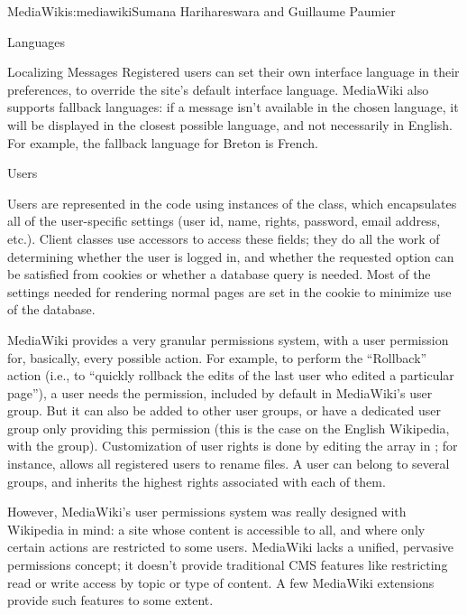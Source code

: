 \begin{aosachapter}{MediaWiki}{s:mediawiki}{Sumana Harihareswara and Guillaume Paumier}
\begin{aosasect1}{Languages}
\begin{aosasect2}{Localizing Messages}
Registered users can set their own interface language in their
preferences, to override the site's default interface
language. MediaWiki also supports fallback languages: if a message
isn't available in the chosen language, it will be displayed in the
closest possible language, and not necessarily in English. For
example, the fallback language for Breton is French.

\end{aosasect2}

\end{aosasect1}

\begin{aosasect1}{Users}

Users are represented in the code using instances of the 
class, which encapsulates all of the user-specific settings (user id,
name, rights, password, email address, etc.). Client classes use
accessors to access these fields; they do all the work of determining
whether the user is logged in, and whether the requested option can be
satisfied from cookies or whether a database query is needed. Most of
the settings needed for rendering normal pages are set in the cookie
to minimize use of the database.

MediaWiki provides a very granular permissions system, with 
a user permission for, basically, every possible action. For example, to perform
the ``Rollback'' action (i.e., to ``quickly rollback the edits of the last
user who edited a particular page''), a user needs the 
permission, included by default in MediaWiki's  user
group. But it can also be added to other user groups, or have a
dedicated user group only providing this permission (this is the case
on the English Wikipedia, with the 
group). Customization of user rights is done by editing the
 array in ; for
instance, 
allows all registered users to rename files. A user can belong to
several groups, and inherits the highest rights associated with each
of them.

However, MediaWiki's user permissions system was really designed with
Wikipedia in mind: a site whose content is accessible to all, and where
only certain actions are restricted to some users. MediaWiki lacks a
unified, pervasive permissions concept; it doesn't provide traditional
CMS features like restricting read or write access by topic or type of
content. A few MediaWiki extensions provide such features to some
extent.


\end{aosasect1}
\end{aosachapter}
